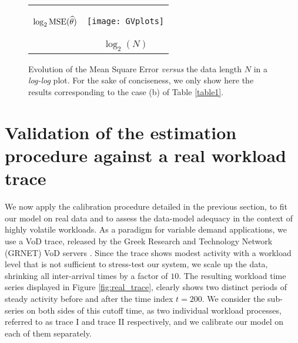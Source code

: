 \documentclass[twoside]{article}
\begin{document}
\begin{figure}[h]
\centering
\hspace*{-5mm}
\begin{tabular}{cc}
\begin{turn}{90} \hspace*{20mm} $\log_2 {\rm MSE}(\widehat{\theta})$ \end{turn}&
\texttt{[image: GVplots]} \\
& $\log_2(N)$ \\
\end{tabular}
\caption{\small Evolution of the Mean Square Error {\em versus} the data length $N$ in a {\em log-log} plot. For the sake of conciseness, we  only show here the results corresponding to the case (b) of Table \ref{table1}.
}
\label{fig:GB}
\end{figure} \newpage

\section{Validation of the estimation procedure against a real workload trace}
\label{sec:validation}
We now apply the calibration procedure detailed in the previous section, to fit our model on real data and to assess the data-model adequacy in the context of highly volatile workloads. As a paradigm for variable demand applications, we use a VoD trace, released by the Greek Research and Technology Network (GRNET) VoD servers \cite{website:grnet}. Since the trace shows modest activity with a workload level that is not sufficient to stress-test our system, we scale up the data, shrinking all inter-arrival times by a factor of $10$. The resulting workload time series displayed in Figure \ref{fig:real_trace}, clearly shows two distinct periods of steady activity before and after the time index $t=200$. We consider the sub-series on both sides of this cutoff time, as two individual workload processes, referred to as trace I and trace II respectively, and we calibrate our model on each of them separately. 
\end{document}
